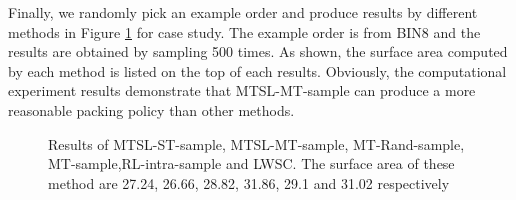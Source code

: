 \begin{figure*}[th]
	\centering
	\caption{Results for multi-task binpacking network. (a), (b), (c) shows the result of BIN8, BIN10, BIN12, respectively.}
	\label{fig:curve-model}
	\vspace{-10pt}
\end{figure*}

Finally, we randomly pick an example order and produce results by different methods in Figure \ref{fig:result-example} for case study. The example order is from BIN8 and the results are obtained by sampling 500 times.
As shown, the surface area computed by each method is listed on the top of each results. Obviously, the computational experiment results demonstrate that MTSL-MT-sample can produce a more reasonable packing policy than other methods. 


\begin{figure}[h]
	\vspace{-10pt}
	\centering
	\caption{Results of MTSL-ST-sample, MTSL-MT-sample, MT-Rand-sample, MT-sample,RL-intra-sample and LWSC. The surface area of these method are 27.24, 26.66, 28.82, 31.86, 29.1 and 31.02 respectively}
	\label{fig:result-example}
	\vspace{-10pt}
\end{figure}

